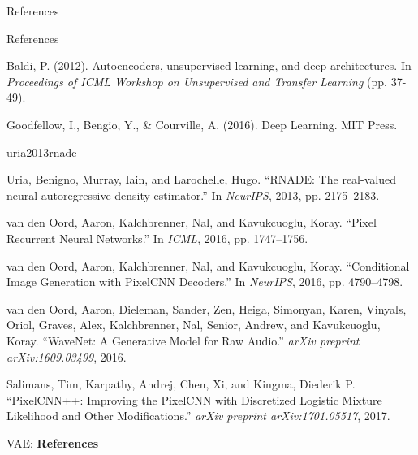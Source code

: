 \begin{frame}[allowframebreaks]{References}
\begin{thebibliography}{9}
{\begin{frame}[allowframebreaks]{References}
\begin{thebibliography}{99}
        Baldi, P. (2012).
        Autoencoders, unsupervised learning, and deep architectures.
        In \textit{Proceedings of ICML Workshop on Unsupervised and Transfer Learning} (pp. 37-49).

        Goodfellow, I., Bengio, Y., \& Courville, A. (2016).
        Deep Learning.
        MIT Press.
    \end{thebibliography}
\end{frame}uria2013rnade}
Uria, Benigno, Murray, Iain, and Larochelle, Hugo. ``RNADE: The real-valued neural autoregressive density-estimator.'' In \emph{NeurIPS}, 2013, pp. 2175--2183.

van den Oord, Aaron, Kalchbrenner, Nal, and Kavukcuoglu, Koray. ``Pixel Recurrent Neural Networks.'' In \emph{ICML}, 2016, pp. 1747--1756.

van den Oord, Aaron, Kalchbrenner, Nal, and Kavukcuoglu, Koray. ``Conditional Image Generation with PixelCNN Decoders.'' In \emph{NeurIPS}, 2016, pp. 4790--4798.

van den Oord, Aaron, Dieleman, Sander, Zen, Heiga, Simonyan, Karen, Vinyals, Oriol, Graves, Alex, Kalchbrenner, Nal, Senior, Andrew, and Kavukcuoglu, Koray. ``WaveNet: A Generative Model for Raw Audio.'' \emph{arXiv preprint arXiv:1609.03499}, 2016.

Salimans, Tim, Karpathy, Andrej, Chen, Xi, and Kingma, Diederik P. ``PixelCNN++: Improving the PixelCNN with Discretized Logistic Mixture Likelihood and Other Modifications.'' \emph{arXiv preprint arXiv:1701.05517}, 2017.
\end{thebibliography}
\end{frame}


\begin{frame}{}
	\LARGE VAE: \textbf{References}
\end{frame}

